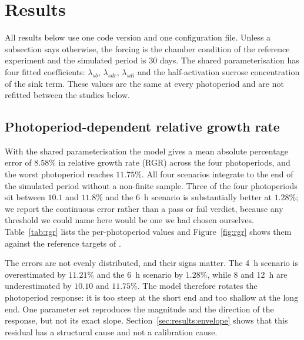 
\section{Results}
\label{sec:results}

All results below use one code version and one configuration file. Unless a
subsection says otherwise, the forcing is the chamber condition of the
reference experiment and the simulated period is 30 days. The shared
parameterisation has four fitted coefficients: $\lambda_{sb}$,
$\lambda_{sdr}$, $\lambda_{sdi}$ and the half-activation sucrose concentration
of the sink term. These values are the same at every photoperiod and are not
refitted between the studies below.

\subsection{Photoperiod-dependent relative growth rate}
\label{sec:results:rgr}

With the shared parameterisation the model gives a mean absolute percentage
error of $8.58\%$ in relative growth rate (RGR) across the four photoperiods,
and the worst photoperiod reaches $11.75\%$. All four scenarios integrate to
the end of the simulated period without a non-finite sample. Three of the four
photoperiods sit between $10.1$ and $11.8\%$ and the 6~h scenario is
substantially better at $1.28\%$; we report the continuous error rather than a
pass or fail verdict, because any threshold we could name here would be one we
had chosen ourselves. Table~\ref{tab:rgr} lists
the per-photoperiod values and Figure~\ref{fig:rgr} shows them against the
reference targets of \citet{Sulpice2014}.

The errors are not evenly distributed, and their signs matter. The 4~h scenario
is overestimated by $11.21\%$ and the 6~h scenario by $1.28\%$, while 8 and
12~h are underestimated by $10.10$ and $11.75\%$. The model therefore rotates
the photoperiod response: it is too steep at the short end and too shallow at
the long end. One parameter set reproduces the magnitude and the direction of
the response, but not its exact slope.
Section~\ref{sec:results:envelope} shows that this residual has a structural
cause and not a calibration cause.

